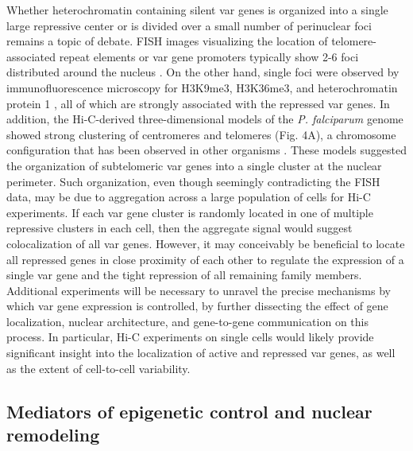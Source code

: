Whether heterochromatin containing silent var genes is organized into a single
large repressive center or is divided over a small number of perinuclear foci
remains a topic of debate. FISH images visualizing the location of
telomere-associated repeat elements or var gene promoters typically show 2-6
foci distributed around the nucleus \citep{lopez-rubio:genome-wide,
freitas-junior:frequent, ralph:antigenic, voss:var}. On the other hand, single
foci were observed by immunofluorescence microscopy for H3K9me3, H3K36me3, and
heterochromatin protein 1 \citep{ukaegbu:recruitment, dahan:pfsec13},
all of which are strongly associated with
the repressed var genes. In addition, the Hi-C-derived three-dimensional
models of the \textit{P. falciparum} genome showed strong clustering of centromeres and
telomeres \citep{ay:three-dimensional} (Fig. 4A), a
chromosome configuration that has been observed in
other organisms \citep{duan:three-dimensional, tanizawa:mapping,
umbarger:three-dimensional}. These models suggested the organization of
subtelomeric var genes into a single cluster at the nuclear perimeter. Such
organization, even though seemingly contradicting the FISH data, may be due to
aggregation across a large population of cells for Hi-C experiments. If each
var gene cluster is randomly located in one of multiple repressive clusters in
each cell, then the aggregate signal would suggest colocalization of all var
genes. However, it may conceivably be beneficial to locate all repressed genes
in close proximity of each other to regulate the expression of a single var
gene and the tight repression of all remaining family members. Additional
experiments will be necessary to unravel the precise mechanisms by which var
gene expression is controlled, by further dissecting the effect of gene
localization, nuclear architecture, and gene-to-gene communication on this
process. In particular, Hi-C experiments on single cells would likely provide
significant insight into the localization of active and repressed var genes,
as well as the extent of cell-to-cell variability. 

\subsection{Mediators of epigenetic control and nuclear remodeling}

